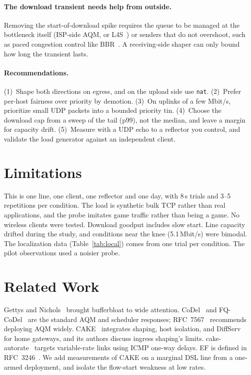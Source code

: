\documentclass[10pt,twocolumn]{article}
\begin{document}
\paragraph{The download transient needs help from outside.} Removing the
start-of-download spike requires the queue to be managed at the bottleneck
itself (ISP-side AQM, or L4S~\cite{rfc9330}) or senders that do not overshoot,
such as paced congestion control like BBR~\cite{bbr}. A receiving-side shaper
can only bound how long the transient lasts.

\paragraph{Recommendations.} (1)~Shape both directions on egress, and on the
upload side use \texttt{nat}. (2)~Prefer per-host fairness over priority by
demotion. (3)~On uplinks of a few Mbit/s, prioritize small UDP packets into a
bounded priority tin. (4)~Choose the download cap from a sweep of the tail
(p99), not the median, and leave a margin for capacity drift. (5)~Measure with
a UDP echo to a reflector you control, and validate the load generator against
an independent client.

\section{Limitations}
This is one line, one client, one reflector and one day, with 8\,s trials and 3--5
repetitions per condition. The load is synthetic bulk TCP rather than real
applications, and the probe imitates game traffic rather than being a game. No
wireless clients were tested. Download goodput includes slow start. Line
capacity drifted during the study, and conditions near the knee
(5.1\,Mbit/s) were bimodal. The localization data (Table~\ref{tab:local}) comes
from one trial per condition. The pilot observations used a noisier probe.

\section{Related Work}
Gettys and Nichols~\cite{gettys2011} brought bufferbloat to wide attention.
CoDel~\cite{codel,rfc8289} and FQ-CoDel~\cite{rfc8290} are the standard AQM and
scheduler responses; RFC~7567~\cite{rfc7567} recommends deploying AQM widely.
CAKE~\cite{cake} integrates shaping, host isolation, and DiffServ for home
gateways, and its authors discuss ingress shaping's limits. cake-autorate~\cite{autorate}
targets variable-rate links using ICMP one-way delays. EF is defined in
RFC~3246~\cite{rfc3246}. We add measurements of CAKE on a marginal DSL line
from a one-armed deployment, and isolate the flow-start weakness at low rates.
\end{document}
